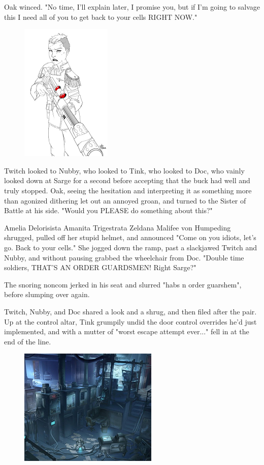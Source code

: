 Oak winced. 
"No time, I'll explain later, I promise you, but if I'm going to salvage this I need all of you to get back to your cells RIGHT NOW."

\begin{figure}
	\begin{center}
		\includegraphics[width=\figwidth]{pics/20/11.png}
	\end{center}
\end{figure}
Twitch looked to Nubby, who looked to Tink, who looked to Doc, who vainly looked down at Sarge for a second before accepting that the buck had well and truly stopped. 
Oak, seeing the hesitation and interpreting it as something more than agonized dithering let out an annoyed groan, and turned to the Sister of Battle at his side. 
"Would you PLEASE do something about this?" 

Amelia Delorisista Amanita Trigestrata Zeldana Malifee von Humpeding shrugged, pulled off her stupid helmet, and announced "Come on you idiots, let's go. 
Back to your cells." She jogged down the ramp, past a slackjawed Twitch and Nubby, and without pausing grabbed the wheelchair from Doc. 
"Double time soldiers, THAT'S AN ORDER GUARDSMEN! 
Right Sarge?" 

The snoring noncom jerked in his seat and slurred "habs n order guarshem", before slumping over again. 


Twitch, Nubby, and Doc shared a look and a shrug, and then filed after the pair. 
Up at the control altar, Tink grumpily undid the door control overrides he'd just implemented, and with a mutter of "worst escape attempt ever..." fell in at the end of the line.

\begin{figure}
	\begin{center}
		\includegraphics[width=\figwidth]{pics/20/12a.png}
	\end{center}
\end{figure}

